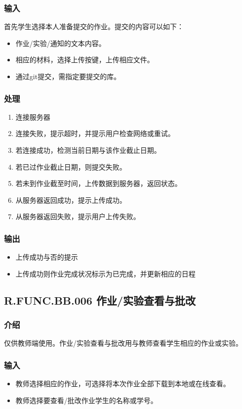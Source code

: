       \subsubsection{输入}
      首先学生选择本人准备提交的作业。提交的内容可以如下：
      \begin{itemize}
        \item 作业/实验/通知的文本内容。
        \item 相应的材料，选择上传按键，上传相应文件。
	      \item 通过git提交，需指定要提交的库。
      \end{itemize}
      \subsubsection{处理}
      \begin{enumerate}
        \item 连接服务器
        \item 连接失败，提示超时，并提示用户检查网络或重试。
        \item 若连接成功，检测当前日期与该作业截止日期。
        \item 若已过作业截止日期，则提交失败。
        \item 若未到作业截至时间，上传数据到服务器，返回状态。
        \item 从服务器返回成功，提示上传成功。
        \item 从服务器返回失败，提示用户上传失败。
      \end{enumerate}
      \subsubsection{输出}
      \begin{itemize}
        \item 上传成功与否的提示
        \item 上传成功则作业完成状况标示为已完成，并更新相应的日程
      \end{itemize}

    \subsection{R.FUNC.BB.006 作业/实验查看与批改}
      \subsubsection{介绍}
      仅供教师端使用。作业/实验查看与批改用与教师查看学生相应的作业或实验。
      \subsubsection{输入}
      \begin{itemize}
        \item 教师选择相应的作业，可选择将本次作业全部下载到本地或在线查看。
        \item 教师选择要查看/批改作业学生的名称或学号。
      \end{itemize}
